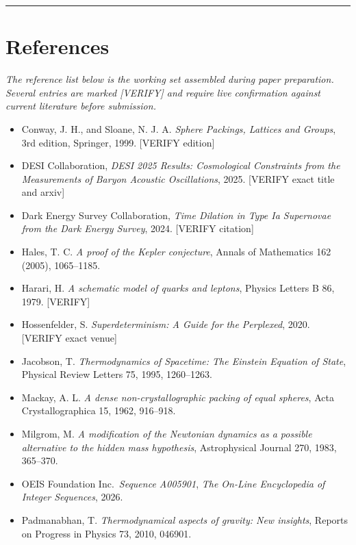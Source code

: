 \documentclass[12pt]{article}
\theoremstyle{definition}
\theoremstyle{remark}
\providecommand{\tightlist}{\setlength{\itemsep}{0pt}\setlength{\parskip}{0pt}}
\begin{document}
\begin{center}\rule{0.5\linewidth}{0.5pt}\end{center}

\section*{References}

\emph{The reference list below is the working set assembled during paper
preparation. Several entries are marked {[}VERIFY{]} and require live
confirmation against current literature before submission.}

\begin{itemize}
\tightlist
\item
  Conway, J. H., and Sloane, N. J. A. \emph{Sphere Packings, Lattices
  and Groups}, 3rd edition, Springer, 1999. {[}VERIFY edition{]}
\item
  DESI Collaboration, \emph{DESI 2025 Results: Cosmological Constraints
  from the Measurements of Baryon Acoustic Oscillations}, 2025.
  {[}VERIFY exact title and arxiv{]}
\item
  Dark Energy Survey Collaboration, \emph{Time Dilation in Type Ia
  Supernovae from the Dark Energy Survey}, 2024. {[}VERIFY citation{]}
\item
  Hales, T. C. \emph{A proof of the Kepler conjecture}, Annals of
  Mathematics 162 (2005), 1065--1185.
\item
  Harari, H. \emph{A schematic model of quarks and leptons}, Physics
  Letters B 86, 1979. {[}VERIFY{]}
\item
  Hossenfelder, S. \emph{Superdeterminism: A Guide for the Perplexed},
  2020. {[}VERIFY exact venue{]}
\item
  Jacobson, T. \emph{Thermodynamics of Spacetime: The Einstein Equation
  of State}, Physical Review Letters 75, 1995, 1260--1263.
\item
  Mackay, A. L. \emph{A dense non-crystallographic packing of equal
  spheres}, Acta Crystallographica 15, 1962, 916--918.
\item
  Milgrom, M. \emph{A modification of the Newtonian dynamics as a
  possible alternative to the hidden mass hypothesis}, Astrophysical
  Journal 270, 1983, 365--370.
\item
  OEIS Foundation Inc.~\emph{Sequence A005901}, \emph{The On-Line
  Encyclopedia of Integer Sequences}, 2026.
\item
  Padmanabhan, T. \emph{Thermodynamical aspects of gravity: New
  insights}, Reports on Progress in Physics 73, 2010, 046901.

\end{itemize}
\end{document}
